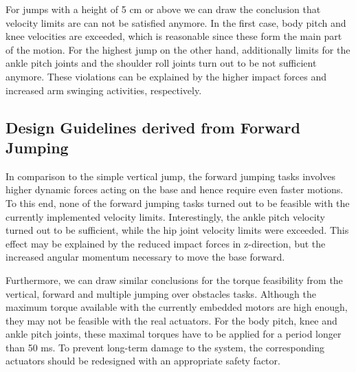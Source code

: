 For jumps with a height of 5 cm or above we can draw the conclusion that velocity limits are can not be satisfied anymore. In the first case, body pitch and knee velocities are exceeded, which is reasonable since these form the main part of the motion. For the highest jump on the other hand, additionally limits for the ankle pitch joints and the shoulder roll joints turn out to be not sufficient anymore. These violations can be explained by the higher impact forces and increased arm swinging activities, respectively. 

\subsection{Design Guidelines derived from Forward Jumping}
In comparison to the simple vertical jump, the forward jumping tasks involves higher dynamic forces acting on the base and hence require even faster motions. To this end, none of the forward jumping tasks turned out to be feasible with the currently implemented velocity limits. Interestingly, the ankle pitch velocity turned out to be sufficient, while the hip joint velocity limits were exceeded. This effect may be explained by the reduced impact forces in z-direction, but the increased angular momentum necessary to move the base forward. 

Furthermore, we can draw similar conclusions for the torque feasibility from the vertical, forward and multiple jumping over obstacles tasks. Although the maximum torque available with the currently embedded motors are high enough, they may not be feasible with the real actuators. For the body pitch, knee and ankle pitch joints, these maximal torques have to be applied for a period longer than 50 ms. To prevent long-term damage to the system, the corresponding actuators should be redesigned with an appropriate safety factor. 





































 



